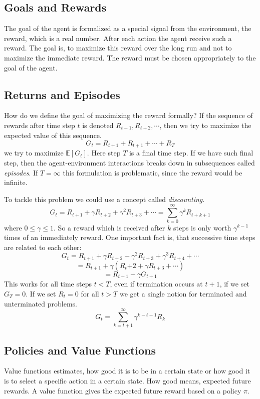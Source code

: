 \documentclass[10pt,a4paper]{article}
\begin{document}
\subsection{Goals and Rewards}
The goal of the agent is formalized as a special signal from the environment, the reward, which is a real number. After each action the agent receive such a reward. The goal is, to maximize this reward over the long run and not to maximize the immediate reward. The reward must be chosen appropriately to the goal of the agent. 

\subsection{Returns and Episodes}
How do we define the goal of maximizing the reward formally? If the sequence of rewards after time step $t$ is denoted $R_{t+1}, R_{t+2}, \cdots$, then we try to maximize the expected value of this sequence.
\[ G_t = R_{t+1} + R_{t+1} + \cdots + R_{T} \]
we try to maximize $\mathbb{E}[G_t]$. Here step $T$ is a final time step. If we have such final step, then the agent-environment interactions breaks down in subsequences called \textit{episodes}. If $T=\infty$ this formulation is problematic, since the reward would be infinite.

To tackle this problem we could use a concept called \textit{discounting}. 
\[ G_t = R_{t+1} + \gamma R_{t+2} + \gamma^2 R_{t+3} + \cdots = \sum_{k=0}^{\infty} \gamma^k R_{t+k+1} \]
where $ 0 \le \gamma \le 1$. So a reward which is received after $k$ steps is only worth $\gamma^{k-1}$ times of an immediately reward.
One important fact is, that successive time steps are related to each other:
\[ G_t = R_{t+1} + \gamma R_{t+2} + \gamma^2 R_{t+3} + \gamma^3 R_{t+4} + \cdots \]
\[ = R_{t+1} + \gamma(R_t{+2} + \gamma R_{t+3} + \cdots ) \]
\[ = R_{t+1} + \gamma G_{t+1} \]
This works for all time steps $t < T$, even if termination occurs at $t+1$, if we set $G_T=0$.
If we set $R_t=0$ for all $t > T$ we get a single notion for terminated and unterminated problems.
\[ G_t = \sum_{k=t+1}^{\infty} \gamma^{k-t-1} R_k\]

\subsection{Policies and Value Functions}
Value functions estimates, how good it is to be in a certain state or how good it is to select a specific action in a certain state.
How good means, expected future rewards. A value function gives the expected future reward based on a policy $\pi$.
\end{document}
